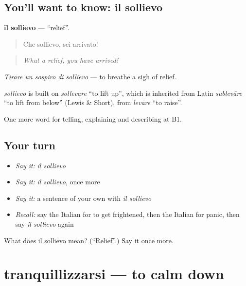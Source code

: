 \subsection*{You'll want to know: il sollievo}
\textbf{il sollievo} — \textquotedblleft{}relief\textquotedblright{}.

\begin{quote}
Che sollievo, sei arrivato!
\end{quote}

\begin{quote}
\emph{What a relief, you have arrived!}
\end{quote}

\emph{Tirare un sospiro di sollievo} — to breathe a sigh of relief.

\begin{cousinweb}
\emph{sollievo} is built on \emph{sollevare} \textquotedblleft{}to lift up\textquotedblright{}, which is inherited from Latin \emph{sublevāre} \textquotedblleft{}to lift from below\textquotedblright{} (Lewis \& Short), from \emph{levāre} \textquotedblleft{}to raise\textquotedblright{}.
\end{cousinweb}

\begin{grammarlens}[title={What you've built}]
One more word for telling, explaining and describing at B1.
\end{grammarlens}

\subsection*{Your turn}
\begin{itemize}
\raggedright
  \item \emph{Say it:} \emph{il sollievo}
  \item \emph{Say it:} \emph{il sollievo}, once more
  \item \emph{Say it:} a sentence of your own with \emph{il sollievo}
  \item \emph{Recall:} say the Italian for to get frightened, then the Italian for panic, then say \emph{il sollievo} again
\end{itemize}

\begin{tcolorbox}[breakable,colback=teal!4,colframe=teal!35!black,title={Before you move on}]
What does il sollievo mean? (\textquotedblleft{}Relief\textquotedblright{}.) Say it once more.
\end{tcolorbox}
\section[tranquillizzarsi]{tranquillizzarsi — to calm down}

